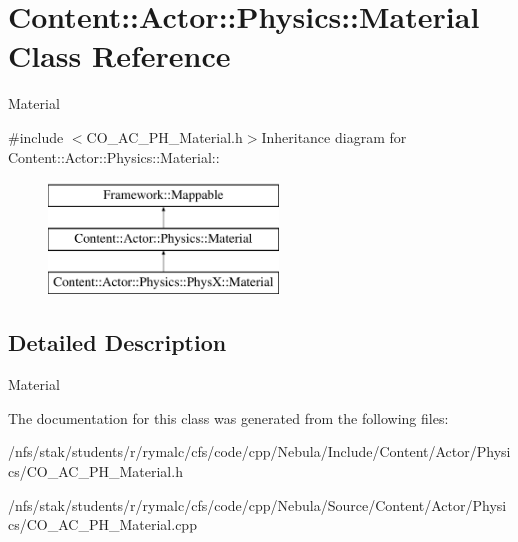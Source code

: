 \hypertarget{classContent_1_1Actor_1_1Physics_1_1Material}{
\section{Content::Actor::Physics::Material Class Reference}
\label{classContent_1_1Actor_1_1Physics_1_1Material}
}


Material  


{\ttfamily \#include $<$CO\_\-AC\_\-PH\_\-Material.h$>$}Inheritance diagram for Content::Actor::Physics::Material::\begin{figure}[H]
\begin{center}
\leavevmode
\includegraphics[height=3cm]{classContent_1_1Actor_1_1Physics_1_1Material}
\end{center}
\end{figure}


\subsection{Detailed Description}
Material 

The documentation for this class was generated from the following files:\begin{DoxyCompactItemize}
\item 
/nfs/stak/students/r/rymalc/cfs/code/cpp/Nebula/Include/Content/Actor/Physics/CO\_\-AC\_\-PH\_\-Material.h\item 
/nfs/stak/students/r/rymalc/cfs/code/cpp/Nebula/Source/Content/Actor/Physics/CO\_\-AC\_\-PH\_\-Material.cpp\end{DoxyCompactItemize}
